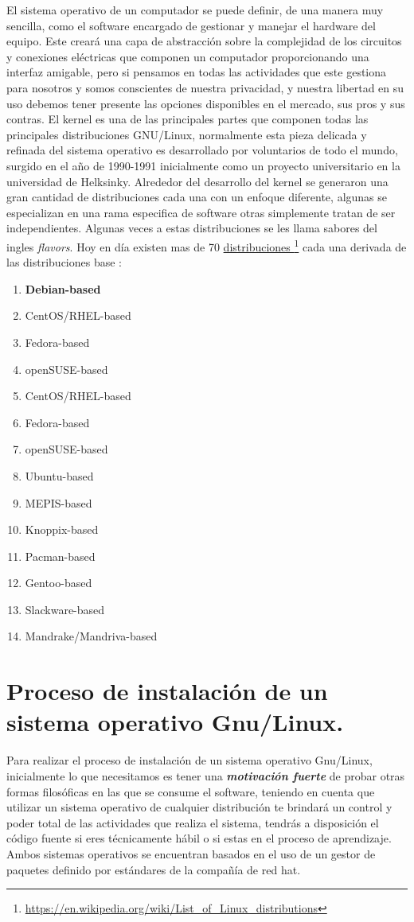 \documentclass[paper=a4, fontsize=12pt]{article} 		%
\newcommand\fnurl[2]{%
\href{#2}{#1}\footnote{\url{#2}}%
}
\numberwithin{equation}{section}						%
\numberwithin{table}{section} 							%
\begin{document}
El sistema operativo de un computador se puede definir, de una manera muy sencilla, como el software encargado de gestionar y manejar el hardware del equipo. Este creará una capa de abstracción sobre la complejidad de los circuitos y conexiones eléctricas que componen un computador proporcionando una interfaz amigable, pero si pensamos en todas las actividades que este gestiona para nosotros y somos conscientes de nuestra privacidad, y nuestra libertad en su uso debemos tener presente las opciones disponibles en el mercado, sus pros y sus contras. El kernel es una de las principales partes que componen todas las principales distribuciones GNU/Linux, normalmente esta pieza delicada y refinada del sistema operativo es desarrollado por voluntarios de todo el mundo, surgido en el año de 1990-1991 inicialmente como un proyecto universitario en la universidad de Helksinky. Alrededor del desarrollo del kernel se generaron una gran cantidad de distribuciones cada una con un enfoque diferente, algunas se especializan en una rama especifica de software otras simplemente tratan de ser independientes. Algunas veces a estas distribuciones se les llama sabores del ingles \textit{flavors}.
Hoy en día existen mas de 70 \fnurl{distribuciones }{https://en.wikipedia.org/wiki/List_of_Linux_distributions} cada una derivada de las distribuciones base :
\begin{multicols}{2}
\begin{enumerate}
\item \textbf{Debian-based}
\item CentOS/RHEL-based
\item Fedora-based
\item openSUSE-based
\item CentOS/RHEL-based
\item Fedora-based
\item openSUSE-based
\item Ubuntu-based
\item MEPIS-based
\item Knoppix-based
\item Pacman-based
\item Gentoo-based
\item Slackware-based
\item Mandrake/Mandriva-based
\end{enumerate}
\end{multicols}
\section{Proceso de instalación de un sistema operativo Gnu/Linux. }
Para realizar el proceso de instalación de un sistema operativo Gnu/Linux, inicialmente lo que necesitamos es tener una \textbf{\textit{motivación fuerte}} de probar otras formas filosóficas en las que se consume el software, teniendo en cuenta que utilizar un sistema operativo de cualquier distribución te brindará un control y poder total de las actividades que realiza el sistema, tendrás a disposición el código fuente si eres técnicamente hábil o si estas en el proceso de aprendizaje. Ambos sistemas operativos se encuentran basados en el uso de un gestor de paquetes definido por estándares de la compañía de red hat.
\end{document}
